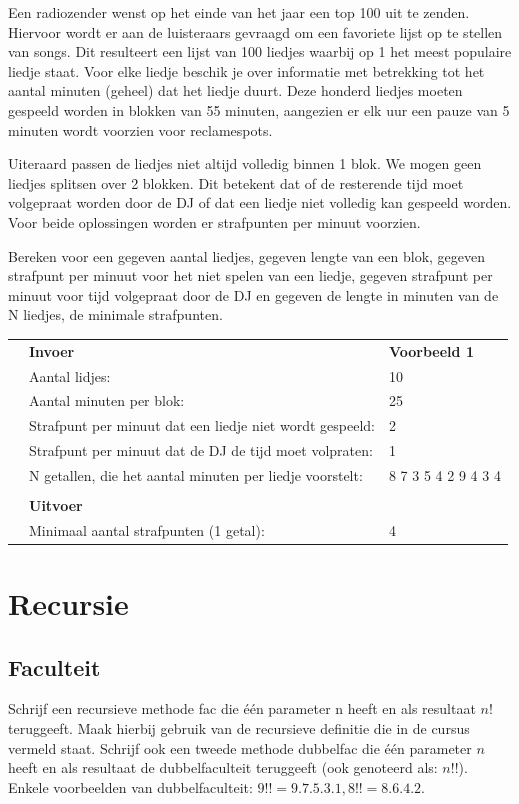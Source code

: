 Een radiozender wenst op het einde van het jaar een top 100 uit te zenden. Hiervoor wordt er aan de luisteraars gevraagd om een favoriete lijst op te stellen van songs. Dit resulteert een lijst van 100 liedjes waarbij op 1 het meest populaire liedje staat. Voor elke liedje beschik je over informatie met betrekking tot het aantal minuten (geheel) dat het liedje duurt. Deze honderd liedjes moeten gespeeld worden in blokken van 55 minuten, aangezien er elk uur een pauze van 5 minuten wordt voorzien voor reclamespots.

Uiteraard passen de liedjes niet altijd volledig binnen 1 blok. We mogen geen liedjes splitsen over 2 blokken. Dit betekent dat of de resterende tijd moet volgepraat worden door de DJ of dat een liedje niet volledig kan gespeeld worden. Voor beide oplossingen worden er strafpunten per minuut voorzien.

Bereken voor een gegeven aantal liedjes, gegeven lengte van een blok, gegeven strafpunt per minuut voor het niet spelen van een liedje, gegeven strafpunt  per minuut voor tijd volgepraat door de DJ en gegeven de lengte in minuten van de N liedjes, de minimale strafpunten.

\begin{tabular}{ p{5 mm} l l }
 & \textbf{Invoer} & \textbf{Voorbeeld 1} \\
 & Aantal lidjes: & 10 \\
 & Aantal minuten per blok: & 25 \\
 & Strafpunt per minuut dat een liedje niet wordt gespeeld: & 2 \\
 & Strafpunt per minuut dat de DJ de tijd moet volpraten: & 1 \\
 & N getallen, die het aantal minuten per liedje voorstelt: & 8 7 3 5 4 2 9 4 3 4 \\
 & & \\
 & \textbf{Uitvoer} & \\
 & Minimaal aantal strafpunten (1 getal): & 4 \\
\end{tabular}

\section{Recursie}

\subsection{Faculteit}

Schrijf een recursieve methode fac die \'e\'en parameter n heeft en als resultaat $n!$ teruggeeft. Maak hierbij gebruik van de recursieve definitie die in de cursus vermeld staat. Schrijf ook een tweede methode dubbelfac die \'e\'en parameter $n$ heeft en als resultaat de dubbelfaculteit teruggeeft (ook genoteerd als: $n!!$). Enkele voorbeelden van dubbelfaculteit: $9!! = 9.7.5.3.1, 8!! = 8.6.4.2$.


